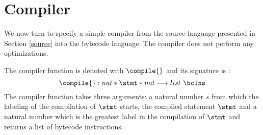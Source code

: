 

\newtheorem{Compiler}{Definition}

\section{Compiler} \label{compile}

We now turn to specify a simple compiler from the source language presented in Section
\ref{source} into the bytecode language. The compiler does not perform any optimizations. 

The compiler function is denoted with $\compile{}$ and its signature is :
$$ \compile{ } : nat * \stmt * nat \longrightarrow list \ \bcIns $$
The compiler function takes three arguments: a natural number $s$ from which the labeling of the compilation of $\stmt$ starts,
 the compiled   statement $\stmt$ and a natural number which is the greatest label in the compilation of  $\stmt$ 
and returns a list of bytecode instructions.



%


